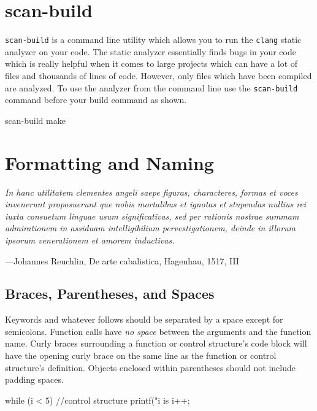 \documentclass[11pt]{article}
\begin{document}
\section{scan-build}

\texttt{scan-build} is a command line utility which allows you to run the \texttt{clang} static analyzer on your code.
The static analyzer essentially finds bugs in your code which is really helpful when it comes to large projects 
which can have a lot of files and thousands of lines of code. However, only files which have been compiled are 
analyzed. To use the analyzer from the command line use the \texttt{scan-build} command before your build command 
as shown.

\begin{codelisting}{}
scan-build make
\end{codelisting}


\section{Formatting and Naming}

\textwidth
\epigraph{\emph{
In hanc utilitatem clementes angeli saepe figuras, characteres, formas et voces
invenerunt proposuerunt que nobis mortalibus et ignotas et stupendas nullius rei
iuxta consuetum linguae usum significativas, sed per rationis nostrae summam
admirationem in assiduam intelligibilium pervestigationem, deinde in illorum
ipsorum venerationem et amorem inductivas.}}{---Johannes Reuchlin, De arte
cabalistica, Hagenhau, 1517, III}


\subsection{Braces, Parentheses, and Spaces}

Keywords and whatever follows should be separated by a space except for
semicolons. Function calls have \emph{no space} between
the arguments and the function name.
Curly braces surrounding a function or control structure's code block will have
the opening curly brace on the same line as the function or control structure's
definition. Objects enclosed within parentheses should not include padding spaces.

\begin{codelisting}{}
while (i < 5) {           //control structure
    printf("i is %
    i++;
}
\end{codelisting}
\end{document}
